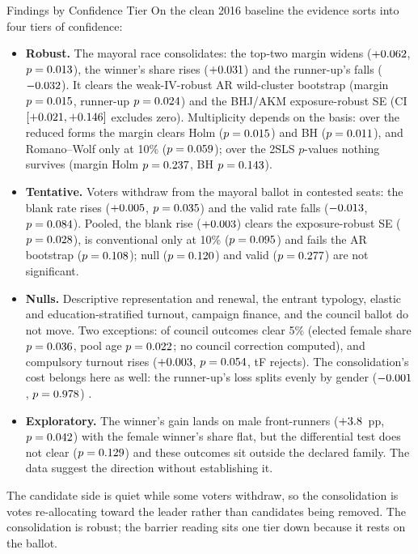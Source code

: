 
\begin{frame}{Findings by Confidence Tier}
\hypertarget{src:findings}{}
\footnotesize
On the clean 2016 baseline the evidence sorts into four tiers of confidence:
\smallskip
\begin{itemize}\itemsep1pt
  \item[\textcolor{myred}{\rule{1.2ex}{1.2ex}}] \textbf{Robust.} The mayoral race consolidates: the top-two margin widens ($+0.062$, $p=0.013$), the winner's share rises ($+0.031$) and the runner-up's falls ($-0.032$). It clears the weak-IV-robust AR wild-cluster bootstrap (margin $p=0.015$, runner-up $p=0.024$) and the BHJ/AKM exposure-robust SE (CI $[+0.021, +0.146]$ excludes zero). Multiplicity depends on the basis: over the \RWFamilyN{} reduced forms the margin clears Holm ($p=0.015$) and BH ($p=0.011$), and Romano--Wolf only at 10\% ($p=0.059$); over the \MultFamilyN{} 2SLS $p$-values nothing survives (margin Holm $p=0.237$, BH $p=0.143$).
  \item[\textcolor{myred!55}{\rule{1.2ex}{1.2ex}}] \textbf{Tentative.} Voters withdraw from the mayoral ballot in contested seats: the blank rate rises ($+0.005$, $p=0.035$) and the valid rate falls ($-0.013$, $p=0.084$). Pooled, the blank rise ($+0.003$) clears the exposure-robust SE ($p=0.028$), is conventional only at 10\% ($p=0.095$) and fails the AR bootstrap ($p=0.108$); null ($p=0.120$) and valid ($p=0.277$) are not significant.
  \item[\textcolor{mygray}{\rule{1.2ex}{1.2ex}}] \textbf{Nulls.} Descriptive representation and renewal, the entrant typology, elastic and education-stratified turnout, campaign finance, and the council ballot do not move. Two exceptions: \CouncilNSig{} of \CouncilNOutcomes{} council outcomes clear 5\% (elected female share $p=0.036$, pool age $p=0.022$; no council correction computed), and compulsory turnout rises ($+0.003$, $p=0.054$, tF rejects). The consolidation's cost belongs here as well: the runner-up's loss splits evenly by gender ($-0.001$, $p=0.978$) \hyperlink{src:gender}{}.
  \item[\textcolor{mygray!55}{\rule{1.2ex}{1.2ex}}] \textbf{Exploratory.} The winner's gain lands on male front-runners ($+3.8$~pp, $p=0.042$) with the female winner's share flat, but the differential test does not clear ($p=0.129$) and these outcomes sit outside the declared family. The data suggest the direction without establishing it.
\end{itemize}
\smallskip
\footnotesize The candidate side is quiet while some voters withdraw, so the consolidation is votes re-allocating toward the leader rather than candidates being removed. The consolidation is robust; the barrier reading sits one tier down because it rests on the ballot.\hfill\hyperlink{app:abstract}{}\, \hyperlink{src:mechanism}{}
\end{frame}

